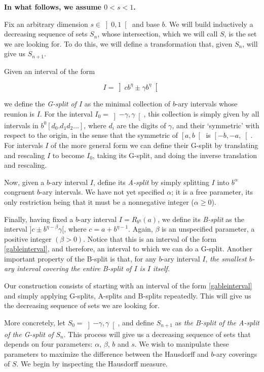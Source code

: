 \documentclass[11pt, reqno]{amsart}
\begin{document}
\textbf{In what follows, we assume $0 < s < 1$.}

Fix an arbitrary dimension $s \in \left]0, 1 \right[$ and base $b$. We will build inductively a decreasing sequence of sets $S_n$, whose intersection, which we will call $S$, is the set we are looking for. To do this, we will define a transformation that, given $S_n$, will give us $S_{n+1}$.

Given an interval of the form

\begin{equation}\label{gableinterval}
I = \left] c b^\eta \pm \gamma b^\eta \right[
\end{equation}

we define the \emph{G-split of $I$} as the minimal collection of $b$-ary intervals whose reunion is $I$. For the interval $I_0 = \left]-\gamma, \gamma\right[$, this collection is simply given by all intervals in $b^0 [ d_0 . d_1 d_2 \dots ]$, where $d_i$ are the digits of $\gamma$, and their `symmetric' with respect to the origin, in the sense that the symmetric of $\left[a,b\right[$ is $\left[-b,-a,\right[$. For intervals $I$ of the more general form we can define their G-split by translating and rescaling $I$ to become $I_0$, taking its G-split, and doing the inverse translation and rescaling.

Now, given a $b$-ary interval $I$, define its \emph{A-split} by simply splitting $I$ into $b^\alpha$ congruent $b$-ary intervals. We have not yet specified $\alpha$; it is a free parameter, its only restriction being that it must be a nonnegative integer ($\alpha \geq 0$).

Finally, having fixed a $b$-ary interval $I = R_{b^\eta}(a)$, we define its \emph{B-split} as the interval $]c \pm b^{\eta - \beta} \gamma[$, where $c = a + b^{\eta - 1}$. Again, $\beta$ is an unspecified parameter, a positive integer $(\beta > 0)$. Notice that this is an interval of the form \eqref{gableinterval}, and therefore, an interval to which we can do a G-split. Another important property of the B-split is that, for any $b$-ary interval $I$, \emph{the smallest $b$-ary interval covering the entire B-split of $I$ is $I$ itself.}

Our construction consists of starting with an interval of the form \eqref{gableinterval} and simply applying G-splits, A-splits and B-splits repeatedly. This will give us the decreasing sequence of sets we are looking for.

More concretely, let $S_0 = \left]-\gamma, \gamma\right[$, and define $S_{n+1}$ as \emph{the B-split of the A-split of the G-split of $S_n$}. This process will give us a decreasing sequence of sets that depends on four parameters: $\alpha$, $\beta$, $b$ and $s$. We wish to manipulate these parameters to maximize the difference between the Hausdorff and $b$-ary coverings of $S$. We begin by inspecting the Hausdorff measure.
\end{document}
